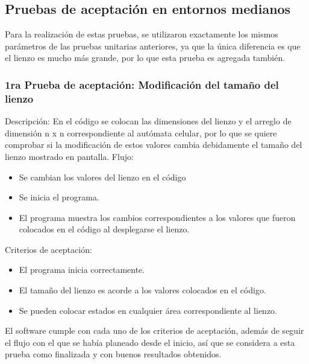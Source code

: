 \subsection{Pruebas de aceptaci\'on en entornos medianos}
    Para la realizaci\'on de estas pruebas, se utilizaron
        exactamente los mismos par\'ametros de las pruebas unitarias
        anteriores, ya que la \'unica diferencia es que el lienzo es
        mucho m\'as grande, por lo que esta prueba es agregada
        tambi\'en.
        \vskip 0.5cm
    \subsubsection{1ra Prueba de aceptaci\'on: Modificaci\'on del tama\~no del lienzo}
    Descripci\'on: En el c\'odigo se colocan las dimensiones del
        lienzo y el arreglo de dimensi\'on n x n correspondiente al
        aut\'omata celular, por lo que se quiere comprobar si la
        modificaci\'on de estos valores cambia debidamente el
        tama\~no del lienzo mostrado en pantalla.
    \vskip 0.5cm
    Flujo:
    \vskip 0.5cm
    \begin{itemize}
        \item Se cambian los valores del lienzo en el c\'odigo
        \item Se inicia el programa.
        \item El programa muestra los cambios correspondientes a los
        valores que fueron colocados en el c\'odigo al
        desplegarse el lienzo.
    \end{itemize}
    \vskip 0.5cm
    Criterios de aceptaci\'on:
    \begin{itemize}
        \item El programa inicia correctamente.
        \item El tama\~no del lienzo es acorde a los valores colocados
        en el c\'odigo.
        \item Se pueden colocar estados en cualquier \'area
        correspondiente al lienzo.
    \end{itemize}
    \vskip 0.5cm
    El software cumple con cada uno de los criterios de
        aceptaci\'on, adem\'as de seguir el flujo con el que se hab\'ia
        planeado desde el inicio, as\'i que se considera a esta prueba
        como finalizada y con buenos resultados obtenidos.
